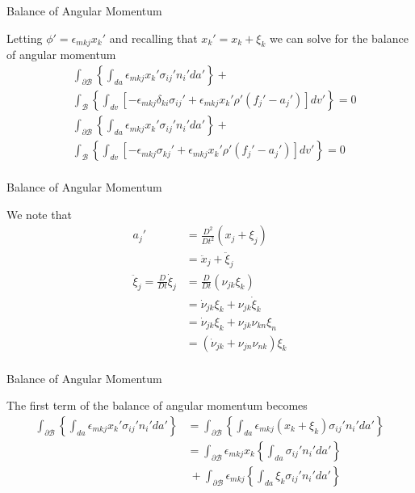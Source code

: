 \documentclass[11pt]{beamer}
\begin{document}
\begin{frame}{Balance of Angular Momentum}

Letting $\phi' = \epsilon_{mkj} x_k'$ and recalling that $x_k' = x_k + \xi_k$ we can solve for the balance of angular momentum
\begin{align*}
&\int_{\partial \mathcal{B}} \left\{\int_{da} \epsilon_{mkj} x_k' \sigma_{ij}' n_i' da'\right\} +\\
&\int_{\mathcal{B}} \left\{\int_{dv} \left[ - \epsilon_{mkj} \delta_{ki} \sigma_{ij}' + \epsilon_{mkj} x_k'\rho'\left(f_j' - a_j'\right) \right]dv'\right\} = 0\\
&\int_{\partial \mathcal{B}} \left\{\int_{da} \epsilon_{mkj} x_k' \sigma_{ij}' n_i' da'\right\} +\\
&\int_{\mathcal{B}} \left\{\int_{dv} \left[ - \epsilon_{mkj} \sigma_{kj}' + \epsilon_{mkj} x_k'\rho'\left(f_j' - a_j'\right) \right]dv'\right\} = 0\\
\end{align*}

\end{frame}

\begin{frame}{Balance of Angular Momentum}

We note that
\begin{align*}
a_j' &= \frac{D^2}{Dt^2}\left(x_j + \xi_j\right)\\
&= \ddot{x}_j + \ddot{\xi}_j\\
\ddot{\xi}_j = \frac{D}{Dt}\dot{\xi}_j &= \frac{D}{Dt}\left(\nu_{jk}\xi_k\right)\\
&= \dot{\nu}_{jk}\xi_k + \nu_{jk} \dot{\xi}_k\\
&= \dot{\nu}_{jk} \xi_k + \nu_{jk} \nu_{kn} \xi_n\\
&= \left(\dot{\nu}_{jk} + \nu_{jn}\nu_{nk}\right)\xi_k\\
\end{align*}

\end{frame}

\begin{frame}{Balance of Angular Momentum}

The first term of the balance of angular momentum becomes
\begin{align*}
\int_{\partial \mathcal{B}} \left\{\int_{da} \epsilon_{mkj} x_k' \sigma_{ij}' n_i' da'\right\} &= \int_{\partial \mathcal{B}} \left\{\int_{da} \epsilon_{mkj} \left(x_k + \xi_k\right) \sigma_{ij}'n_i' da' \right\}\\
&= \int_{\partial \mathcal{B}} \epsilon_{mkj} x_k \left\{\int_{da} \sigma_{ij}'n_i' da'\right\}\\
&\ + \int_{\partial \mathcal{B}} \epsilon_{mkj}\left\{\int_{da} \xi_k \sigma_{ij}'n_i' da' \right\}\\
\end{align*}

\end{frame}
\end{document}
